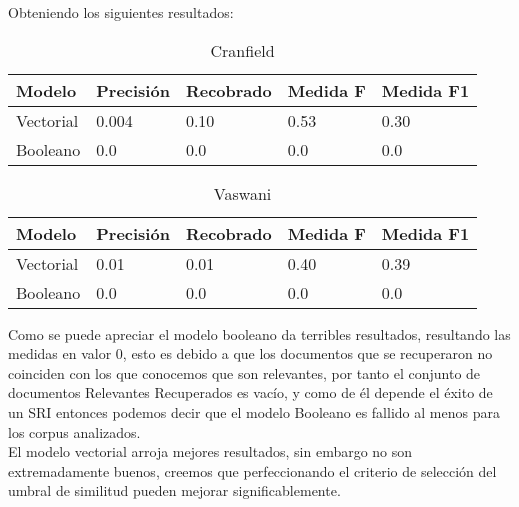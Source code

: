 \documentclass[runningheads,a4paper]{llncs}
\begin{document}
Obteniendo los siguientes resultados:


\begin{table}[h]
\caption{Cranfield} %
\centering
\begin{tabular}{lllll}
Modelo & Precisi\'on & Recobrado  &Medida F  &Medida F1\\[0.5ex]
\hline
Vectorial &  0.004 & 0.10 & 0.53 & 0.30 \\[0.5ex]
\hline
 Booleano & 0.0 & 0.0 & 0.0 &0.0   
\end{tabular}
\end{table}

\begin{table}[h]
\caption{Vaswani} %
\centering
\begin{tabular}{lllll}
Modelo & Precisi\'on & Recobrado  &Medida F  &Medida F1\\[0.5ex]
\hline
Vectorial & 0.01 & 0.01 & 0.40 & 0.39 \\[0.5ex]
\hline
 Booleano & 0.0 & 0.0 & 0.0 &0.0     
\end{tabular}
\end{table}

Como se puede apreciar el modelo booleano da terribles resultados, resultando las medidas en valor 0, esto es debido a que los documentos que se recuperaron no coinciden con los que conocemos que son relevantes, por tanto el conjunto de documentos Relevantes Recuperados es vac\'io, y como de \'el depende el \'exito de un SRI entonces podemos decir que el modelo Booleano es fallido al menos para los corpus analizados.\\

El modelo vectorial arroja mejores resultados, sin embargo no son extremadamente buenos, creemos que perfeccionando el criterio de selecci\'on del umbral de similitud pueden mejorar significablemente. 
\end{document}
